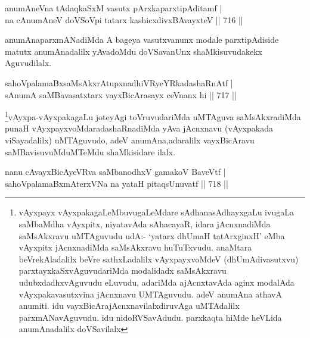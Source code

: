 \begin{shl}
anumAneVna tAdaqkaSxM vasutx pArxkaparxtipAditamf | \\
na cAnumAneV doVSoV\s pi tatarx kashicxdivxBAvayxteV \hfill||  716 ||  
\end{shl}

\begin{artha}
anumAnaparxmANadiMda A bageya vasutxvanunx modale parxtipAdiside matutx anumAnadalilx yAvadoMdu doVSavanUnx shaMkisuvudakekx Aguvudilalx.
\end{artha}


\begin{shl}
sahoVpalamaBxsaMsAkxrAtupxnadhiVRyeYRkadashaRnAtf | \\
sA\s numA saMBavasatxtarx vayxBicArasayx ceVnanx hi \hfill||  717 ||  
\end{shl}

\begin{artha}
\footnote{vAyxpayx vAyxpakagaLeMbuvugaLeMdare sAdhanasAdhayxgaLu ivugaLa saMbaMdha vAyxpitx, niyatavAda sAhacayaR, idara jAcnxnadiMda saMsAkxravu uMTAguvudu udA:- `yatarx dhUmaH tatArxginxH' eMba vAyxpitx jAcnxnadiMda saMsAkxravu huTuTxvudu. anaMtara beVrekAladalilx  beVre sathxLadalilx vAyxpayxvoMdeV (dhUmAdivasutxvu) parxtayxkaSxvAguvudariMda modalidadx saMsAkxravu udubxdadhxvAguvudu eLuvudu, adariMda ajAcnxtavAda aginx modalAda vAyxpakavasutxvina jAcnxnavu UMTAguvudu. adeV anumAna athavA anumiti. idu vayxBicArajAcnxnavilalxdiruvAga uMTAdalilx parxmANavAguvudu. idu nidoRVSavAdudu. parxkaqta hiMde heVLida anumAnadalilx doVSavilalx}vAyxpa-vAyxpakagaLu joteyAgi toVruvudariMda uMTAguva saMsAkxradiMda punaH vAyxpayxvoMdaradashaRnadiMda yAva jAcnxnavu (vAyxpakada viSayadalilx) uMTAguvudo, adeV anumAna,adaralilx vayxBicAravu saMBavisuvuMduMTeMdu shaMkisidare ilalx.
\end{artha}


\begin{shl}
nanu cAvayxBicAyeVRva saMbanodhxV gamakoV BaveVtf | \\
sahoVpalamaBxmAterxVNa na yataH pitaqsUnuvatf \hfill||  718 ||  
\end{shl}

